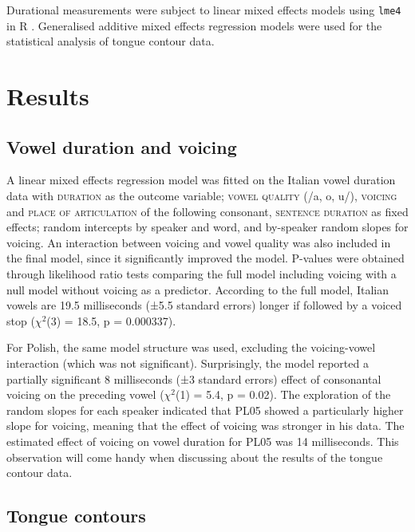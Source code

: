 \documentclass[authoryear, twocolumn]{elsarticle}
\begin{document}
Durational measurements were subject to linear mixed effects models
using \texttt{lme4} in R \citep{r-core-team2017, bates2015}. Generalised
additive mixed effects regression models \citep[GAMMs,][]{wood2006} were
used for the statistical analysis of tongue contour data.

\section{Results}\label{results}

\subsection{Vowel duration and
voicing}\label{vowel-duration-and-voicing}

A linear mixed effects regression model was fitted on the Italian vowel
duration data with \textsc{duration} as the outcome variable;
\textsc{vowel quality} (/a, o, u/), \textsc{voicing} and
\textsc{place of articulation} of the following consonant,
\textsc{sentence duration} as fixed effects; random intercepts by
speaker and word, and by-speaker random slopes for voicing. An
interaction between voicing and vowel quality was also included in the
final model, since it significantly improved the model. P-values were
obtained through likelihood ratio tests comparing the full model
including voicing with a null model without voicing as a predictor.
According to the full model, Italian vowels are 19.5 milliseconds (±5.5
standard errors) longer if followed by a voiced stop (\(\chi^2\)(3) =
18.5, p = 0.000337).

For Polish, the same model structure was used, excluding the
voicing-vowel interaction (which was not significant). Surprisingly, the
model reported a partially significant 8 milliseconds (±3 standard
errors) effect of consonantal voicing on the preceding vowel
(\(\chi^2\)(1) = 5.4, p = 0.02). The exploration of the random slopes
for each speaker indicated that PL05 showed a particularly higher slope
for voicing, meaning that the effect of voicing was stronger in his
data. The estimated effect of voicing on vowel duration for PL05 was 14
milliseconds. This observation will come handy when discussing about the
results of the tongue contour data.

\subsection{Tongue contours}\label{tongue-contours}
\end{document}
